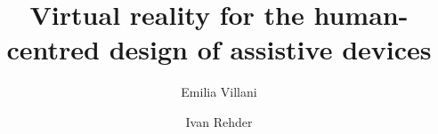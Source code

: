 
\title{Virtual reality for the human-centred design of assistive devices}

\author[ita]{Emilia Villani}
\author[ita]{Ivan Rehder}


